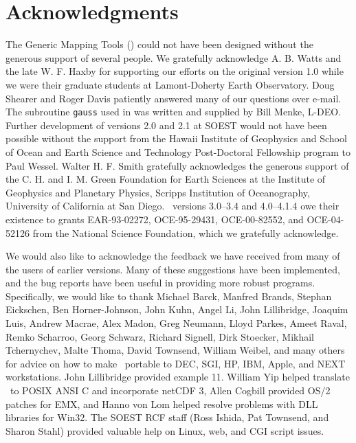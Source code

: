 %
%


\chapter*{Acknowledgments}

The Generic Mapping Tools (\GMT) could not have been designed without
the generous support of several people.  We gratefully acknowledge
A. B. Watts and the late W. F. Haxby for supporting our efforts on the original
version 1.0 while we were their graduate students at Lamont-Doherty
Earth Observatory.  Doug Shearer and Roger Davis patiently answered
many of our questions over e-mail.  The subroutine \texttt{gauss} used in
 was written and supplied by Bill Menke, L-DEO.
Further development of versions 2.0 and 2.1 at SOEST would not have
been possible without the support from the Hawaii Institute of
Geophysics and School of Ocean and Earth Science and Technology
Post-Doctoral Fellowship program to Paul Wessel.  Walter H. F. Smith
gratefully acknowledges the generous support of the C. H. and I. M.
Green Foundation for Earth Sciences at the Institute of Geophysics
and Planetary Physics, Scripps Institution of Oceanography, University
of California at San Diego.
\GMT\ versions 3.0--3.4 and 4.0--4.1.4 owe their existence to grants
EAR-93-02272, OCE-95-29431, OCE-00-82552, and OCE-04-52126
from the National Science Foundation, which we gratefully acknowledge.

We would also like to acknowledge the feedback we have received from many
of the users of earlier versions.  Many of these suggestions have
been implemented, and the bug reports have been useful in providing
more robust programs.  Specifically, we would like to thank
Michael Barck,
Manfred Brands,
Stephan Eickschen,
Ben Horner-Johnson,
John Kuhn,
Angel Li,
John Lillibridge,
Joaquim Luis,
Andrew Macrae,
Alex Madon,
Greg Neumann,
Lloyd Parkes,
Ameet Raval,
Remko Scharroo,
Georg Schwarz,
Richard Signell,
Dirk Stoecker,
Mikhail Tchernychev,
Malte Thoma,
David Townsend,
William Weibel,
and many others for
advice on how to make \GMT\ portable to DEC, SGI, HP, IBM, Apple, and
NEXT workstations.  John Lillibridge provided example 11.  William
Yip helped translate \GMT\ to POSIX ANSI C and incorporate netCDF 3, 
Allen Cogbill provided OS/2 patches for EMX, and Hanno von Lom helped
resolve problems with DLL libraries for Win32.  The SOEST RCF staff
(Ross Ishida, Pat Townsend, and Sharon Stahl) provided valuable help
on Linux, web, and CGI script issues.

